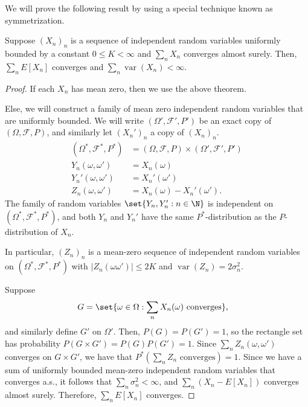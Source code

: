 \documentclass[10pt]{mypackage}
\begin{document}
We will prove the following result by using a special technique known as symmetrization.
\begin{lemma}
  Suppose $\left( X_n \right)_n$ is a sequence of independent random variables uniformly bounded by a constant $0\leq K < \infty$ and $\sum_{n}X_n$ converges almost surely. Then, $\sum_{n}E\left[ X_n \right]$ converges and $\sum_{n}\operatorname{var}\left( X_n \right) < \infty$.
\end{lemma}
\begin{proof}
  If each $X_n$ has mean zero, then we use the above theorem.

  Else, we will construct a family of mean zero independent random variables that are uniformly bounded. We will write $\left( \Omega',\mathcal{F}',P' \right)$ be an exact copy of $\left( \Omega,\mathcal{F},P \right)$, and similarly let $\left( X_n' \right)_{n}$ a copy of $\left( X_n \right)_n$.
  \begin{align*}
    \left( \Omega^{\ast},\mathcal{F}^{\ast},P^{\ast} \right) &= \left( \Omega,\mathcal{F},P \right)\times \left( \Omega',\mathcal{F}',P' \right)\\
    Y_n\left( \omega,\omega' \right) &= X_n\left( \omega \right)\\
    Y_n'\left( \omega,\omega' \right) &= X_n'\left( \omega' \right)\\
    Z_n\left( \omega,\omega' \right) &= X_n\left( \omega \right)-X_n'\left( \omega' \right).
  \end{align*}
  The family of random variables $\set{Y_n,Y_n' : n\in \N}$ is independent on $\left( \Omega^{\ast},\mathcal{F}^{\ast} ,P^{\ast}\right)$, and both $Y_n$ and $Y_n'$ have the same $P^{\ast}$-distribution as the $P$-distribution of $X_n$.

  In particular, $\left( Z_n \right)_{n}$ is a mean-zero sequence of independent random variables on $\left( \Omega^{\ast},\mathcal{F}^{\ast},P^{\ast} \right)$ with $\left\vert Z_n\left( \omega\omega' \right) \right\vert\leq 2K$ and $\operatorname{var}\left( Z_n \right) = 2\sigma_n^2$.

  Suppose
  \begin{align*}
    G &= \set{\omega\in \Omega : \sum_{n}X_n(\omega)\text{ converges}},
  \end{align*}
  and similarly define $G'$ on $\Omega'$. Then, $P\left( G \right) = P\left( G' \right) = 1$, so the rectangle set has probability $P\left( G\times G' \right) = P\left( G \right)P\left( G' \right) = 1$. Since $\sum_{n}Z_n\left( \omega,\omega' \right)$ converges on $G\times G'$, we have that $P^{\ast}\left( \sum_{n}Z_n\text{ converges} \right) = 1$. Since we have a sum of uniformly bounded mean-zero independent random variables that converges a.s., it follows that $\sum_{n}\sigma_n^2 < \infty$, and $\sum_{n}\left( X_n-E\left[ X_n \right] \right)$ converges almost surely. Therefore, $\sum_{n}E\left[ X_n \right]$ converges.
\end{proof}
\end{document}

